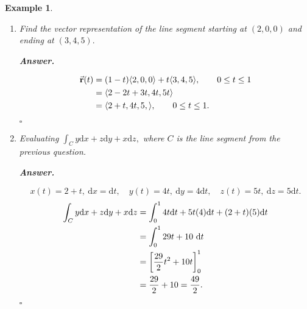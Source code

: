 \documentclass[12pt,a4paper]{article}
\newtheorem{eg}{Example}[subsection]
\newenvironment*{ans}{\par\indent\textbf{\textit{Answer. }}\par}{\par\hfill{$\square$}\par}
\def\dsst{\displaystyle}
\def\d{{\mathrm{d}}}
\def\dx{\d x}
\def\dy{\d y}
\def\dz{\d z}
\def\dt{\d t}
\def\intC{\dsst\int_C}
\def\vecr{\va{{\textbf{r}}}}
\begin{document}
\begin{eg}
\begin{enumerate}
	\item Find the vector representation of the line segment starting at $(2,0,0)$ and ending at $(3,4,5).$
	\begin{ans}
		\[\begin{aligned}\vecr(t)&=(1-t)\langle2,0,0\rangle+t\langle3,4,5\rangle,\qquad0\leq t\leq1\\&=\langle2-2t+3t,4t,5t\rangle\\&=\langle2+t,4t,5,\rangle,\qquad0\leq t\leq1.\end{aligned}\]
	\end{ans}
	\item Evaluating $\intC y\dx+z\dy+x\dz,$ where $C$ is the line segment from the previous question.
	\begin{ans}
		\[x(t)=2+t,\ \dx=\dt,\quad y(t)=4t,\ \dy=4\dt,\quad z(t)=5t,\ \dz=5\dt.\] \[\begin{aligned}\intC y\dx+z\dy+x\dz&=\int_0^14t\dt+5t(4)\dt+(2+t)(5)\dt\\&=\int_0^129t+10\ \dt\\&=\qty[\dfrac{29}{2}t^2+10t]_0^1\\&=\dfrac{29}{2}+10=\dfrac{49}{2}.\end{aligned}\]
	\end{ans}
\end{enumerate}	
\end{eg}
\end{document}
